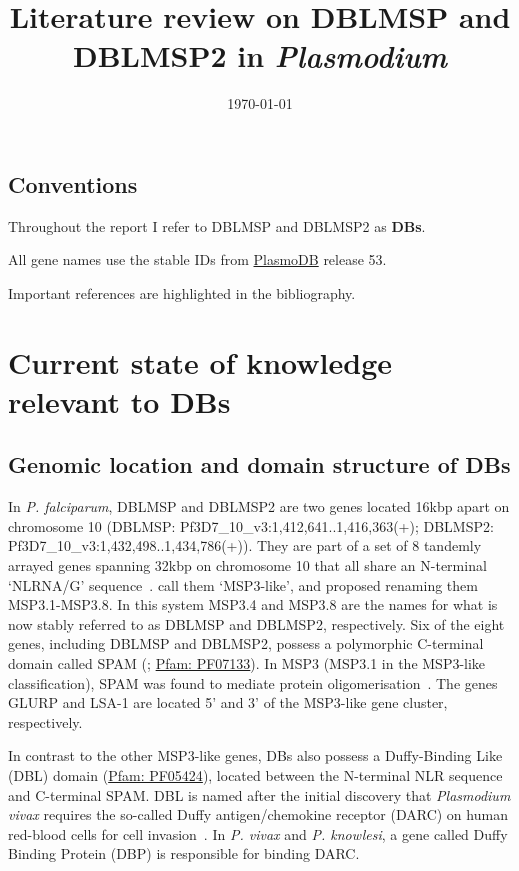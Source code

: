 \documentclass[12pt]{article}
\title{Literature review on DBLMSP and DBLMSP2 in \textit{Plasmodium}}
\date{\today}
\begin{document}
\maketitle

\subsection*{Conventions}

Throughout the report I refer to DBLMSP and DBLMSP2 as \textbf{DBs}.

All gene names use the stable IDs from \href{https://plasmodb.org/plasmo/app/}{PlasmoDB} release 53.

Important references are highlighted in the bibliography.

\section{Current state of knowledge relevant to DBs}

\subsection{Genomic location and domain structure of DBs}

In \textit{P. falciparum}, DBLMSP and DBLMSP2 are two genes located 16kbp apart on
chromosome 10 (DBLMSP: Pf3D7\_10\_v3:1,412,641..1,416,363(+); DBLMSP2:
Pf3D7\_10\_v3:1,432,498..1,434,786(+)). They are part of a set of 8 tandemly arrayed
genes spanning 32kbp on chromosome 10 that all share an N-terminal `NLRNA/G'
sequence~\cite{singh_conserved_2009}. \cite{singh_conserved_2009} call them `MSP3-like',
and proposed renaming them MSP3.1-MSP3.8. In this system MSP3.4 and MSP3.8 are the names
for what is now stably referred to as DBLMSP and DBLMSP2, respectively. Six of the eight
genes, including DBLMSP and DBLMSP2, possess a polymorphic C-terminal domain called SPAM
(\cite{MCCOLL199453}; \href{http://pfam.xfam.org/family/PF07133}{Pfam: PF07133}). In MSP3
(MSP3.1 in the MSP3-like classification), SPAM was found to mediate protein
oligomerisation~\cite{gondeau_c-terminal_2009}. The genes GLURP and LSA-1 are located
5' and 3' of the MSP3-like gene cluster, respectively. 

In contrast to the other MSP3-like genes, DBs also possess a Duffy-Binding Like (DBL)
domain (\href{http://pfam.xfam.org/family/PF05424}{Pfam: PF05424}), located between the
N-terminal NLR sequence and C-terminal SPAM. DBL is named after the initial discovery
that \textit{Plasmodium vivax} requires the so-called Duffy antigen/chemokine receptor
(DARC) on human red-blood cells for cell invasion~\cite{Miller561}. In \textit{P. vivax}
and \textit{P. knowlesi}, a gene called Duffy Binding Protein (DBP) is responsible for binding DARC. 
\end{document}
